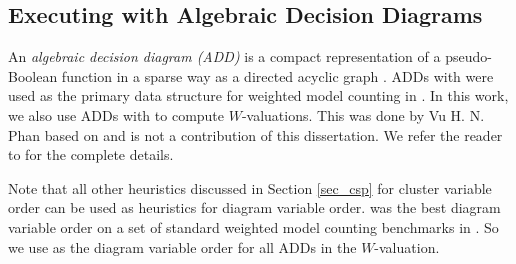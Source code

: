 \subsection{Executing with Algebraic Decision Diagrams}
An \emph{algebraic decision diagram (ADD)} is a compact representation of a pseudo-Boolean function in a sparse way as a directed acyclic graph \cite{bahar1997algebraic}.
ADDs with \cudd{} were used as the primary data structure for weighted model counting in  \cite{DPV20,phan2019weighted}.
In this work, we also use ADDs with \cudd{} to compute $W$-valuations.
This was done by Vu H. N. Phan based on  and is not a contribution of this dissertation. We refer the reader to \cite{dudek2020dpmc} for the complete details.

Note that all other heuristics discussed in Section \ref{sec_csp} for cluster variable order can be used as heuristics for diagram variable order.
\Mcs{} was the best diagram variable order on a set of standard weighted model counting benchmarks in \cite{DPV20}.
So we use \Mcs{} as the diagram variable order for all ADDs in the $W$-valuation.

